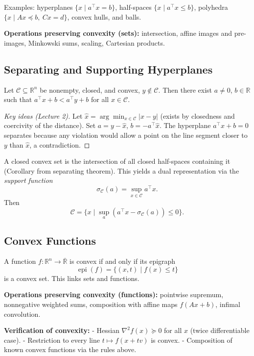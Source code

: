 Examples: hyperplanes $\{x\mid a^\top x=b\}$, half-spaces $\{x\mid
a^\top x\le b\}$, polyhedra $\{x\mid Ax\preceq b,\ Cx=d\}$, convex
hulls, and balls.

\textbf{Operations preserving convexity (sets):} intersection, affine
images and pre-images, Minkowski sums, scaling, Cartesian products.

\subsection{Separating and Supporting Hyperplanes}
\begin{theorem}
Let $\mathcal{C}\subseteq\mathbb{R}^n$ be nonempty, closed, and
convex, $y\notin\mathcal{C}$. Then there exist $a\neq0$,
$b\in\mathbb{R}$ such that $a^\top x+b<a^\top y+b$ for all $x\in\mathcal{C}$.
\end{theorem}
\begin{proof}[Key ideas (Lecture 2)]
Let $\hat{x}=\arg\min_{x\in\mathcal{C}}|x-y|$ (exists by closedness
and coercivity of the distance). Set $a=y-\hat{x}$,
$b=-a^\top\hat{x}$. The hyperplane $a^\top x+b=0$ separates because
any violation would allow a point on the line segment closer to $y$
than $\hat{x}$, a contradiction.
\end{proof}

A closed convex set is the intersection of all closed half-spaces
containing it (Corollary from separating theorem). This yields a dual
representation via the \emph{support function}
\[
\sigma_{\mathcal{C}}(a)=\sup_{x\in\mathcal{C}}a^\top x.
\]
Then
\[
\mathcal{C}=\bigl\{x\mid\sup_{a}(a^\top x-\sigma_{\mathcal{C}}(a))\le0\bigr\}.
\]

\subsection{Convex Functions}
A function $f:\mathbb{R}^n\to\overline{\mathbb{R}}$ is convex if and
only if its epigraph
\[
\operatorname{epi}(f)=\{(x,t)\mid f(x)\le t\}
\]
is a convex set. This links sets and functions.

\textbf{Operations preserving convexity (functions):} pointwise
supremum, nonnegative weighted sums, composition with affine maps
$f(Ax+b)$, infimal convolution.

\textbf{Verification of convexity:}
- Hessian $\nabla^2f(x)\succeq0$ for all $x$ (twice differentiable case).
- Restriction to every line $t\mapsto f(x+tv)$ is convex.
- Composition of known convex functions via the rules above.

